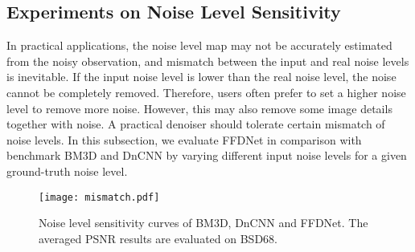 \documentclass[journal]{IEEEtran}
\begin{document}
\subsection{Experiments on Noise Level Sensitivity}

In practical applications, the noise level map may not be accurately estimated from the noisy observation, and mismatch between the input and real noise levels is inevitable. If the input noise level is lower than the real noise level, the noise cannot be completely removed. Therefore, users often prefer to set a higher noise level to remove more noise. However, this may also remove some image details together with noise. A practical denoiser should tolerate certain mismatch of noise levels. In this subsection, we evaluate FFDNet in comparison with benchmark BM3D and DnCNN by varying different input noise levels for a given ground-truth noise level.

\begin{figure}[!bp]
\begin{center}
\subfigure
{\texttt{[image: mismatch.pdf]}}
\caption{Noise level sensitivity curves of BM3D, DnCNN and FFDNet. The averaged PSNR results are evaluated on BSD68.}\label{fig_nm1}
\end{center}\end{figure}
\end{document}
